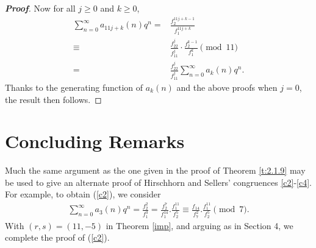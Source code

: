 \documentclass[a4paper,12pt,reqno]{amsart}
\numberwithin{equation}{section}
\begin{document}
\begin{proof}[\it\textbf{Proof}]
	Now for all $j\geq0$ and $k \geq0$,
	\begin{align*}
		\sum_{n=0}^{\infty} a_{11j+k}(n) q^n
		= &\frac{f_2^{11j+k-1}}{f_1^{11j+k}}\\
		\equiv&\frac{f_{22}^j}{f_{11}^j} \cdot \frac{f_2^{k-1}}{f_1^k}
		\pmod{11}\\
		= &\frac{f_{22}^j}{f_{11}^j} \sum_{n=0}^{\infty} a_k(n) q^n .
	\end{align*}
	Thanks to the generating function of $a_k(n)$ and %
	the above proofs when $j=0$, the result then follows.
\end{proof}
\section{Concluding Remarks}
Much the same argument as the one given in the proof of Theorem \ref{t:2.1.9} may be used to give an alternate proof of Hirschhorn and Sellers' congruences \eqref{c2}-\eqref{c4}.
For example, to obtain (\ref{c2}), we consider 
\begin{align*}
	\sum_{n=0}^{\infty}a_{3}(n)q^n=\frac{f_2^{2}}{f_1^{3}}
	=\frac{f_2^{7}}{f_1^{14}}.\frac{f_1^{11}}{f_2^5}
	\equiv\frac{f_{14}}{f_{7}^2}.\frac{f_1^{11}}{f_2^5}\pmod{7}.
\end{align*}
With $(r,s)=(11,-5)$ in Theorem \ref{imp}, and arguing as in Section 4, we complete the proof of (\ref{c2}).
\footnotesize
\end{document}
